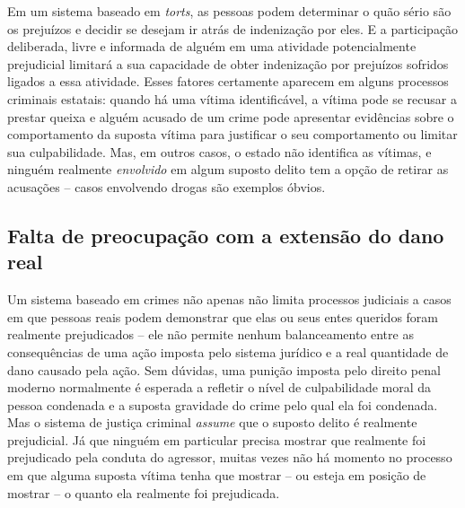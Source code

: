 Em um sistema baseado em \emph{torts}, as pessoas podem determinar o quão sério são os prejuízos e decidir se desejam ir atrás de indenização por eles. E a participação deliberada, livre e informada de alguém em uma atividade potencialmente prejudicial limitará a sua capacidade de obter indenização por prejuízos sofridos ligados a essa atividade. Esses fatores certamente aparecem em alguns processos criminais estatais: quando há uma vítima identificável, a vítima pode se recusar a prestar queixa e alguém acusado de um crime pode apresentar evidências sobre o comportamento da suposta vítima para justificar o seu comportamento ou limitar sua culpabilidade. Mas, em outros casos, o estado não identifica as vítimas, e ninguém realmente \emph{envolvido} em algum suposto delito tem a opção de retirar as acusações -- casos envolvendo drogas são exemplos óbvios.

\subsection*{Falta de preocupação com a extensão do dano real}

Um sistema baseado em crimes não apenas não limita processos judiciais a casos em que pessoas reais podem demonstrar que elas ou seus entes queridos foram realmente prejudicados -- ele não permite nenhum balanceamento entre as consequências de uma ação imposta pelo sistema jurídico e a real quantidade de dano causado pela ação. Sem dúvidas, uma punição imposta pelo direito penal moderno normalmente é esperada a refletir o nível de culpabilidade moral da pessoa condenada e a suposta gravidade do crime pelo qual ela foi condenada. Mas o sistema de justiça criminal \emph{assume} que o suposto delito é realmente prejudicial. Já que ninguém em particular precisa mostrar que realmente foi prejudicado pela conduta do agressor, muitas vezes não há momento no processo em que alguma suposta vítima tenha que mostrar -- ou esteja em posição de mostrar -- o quanto ela realmente foi prejudicada.

